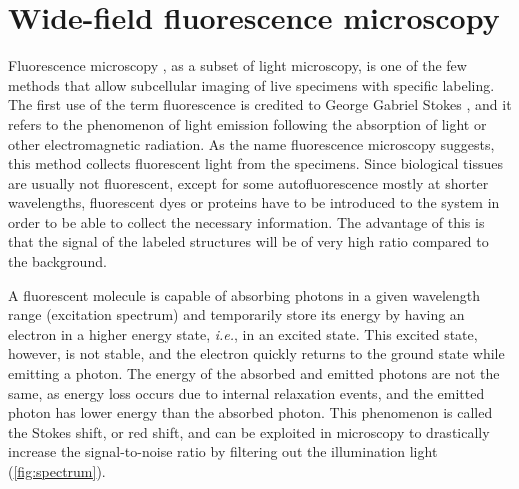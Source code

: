 
\section{Wide-field fluorescence microscopy}

Fluorescence microscopy \cite{lichtman_fluorescence_2005,diaspro_optical_2011}, as a subset of light microscopy, is one of the few methods that allow subcellular imaging of live specimens with specific labeling.
The first use of the term fluorescence is credited to  George Gabriel Stokes \cite{stokes_change_1852}, and it refers to the phenomenon of light emission following the absorption of light or other electromagnetic radiation. As the name fluorescence microscopy suggests, this method collects fluorescent light from the specimens.
Since biological tissues are usually not fluorescent, except for some autofluorescence mostly at shorter wavelengths, fluorescent dyes or proteins have to be introduced to the system in order to be able to collect the necessary information. The advantage of this is that the signal of the labeled structures will be of very high ratio compared to the background.

A fluorescent molecule is capable of absorbing photons in a given wavelength range (excitation spectrum) and temporarily store its energy by having an electron in a higher energy state, \textit{i.e.}, in an excited state. This excited state, however, is not stable, and the electron quickly returns to the ground state while emitting a photon. The energy of the absorbed and emitted photons are not the same, as energy loss occurs due to internal relaxation events, and the emitted photon has lower energy than the absorbed photon. This phenomenon is called the Stokes shift, or red shift, and can be exploited in microscopy to drastically increase the signal-to-noise ratio by filtering out the illumination light (\autoref{fig:spectrum}).

